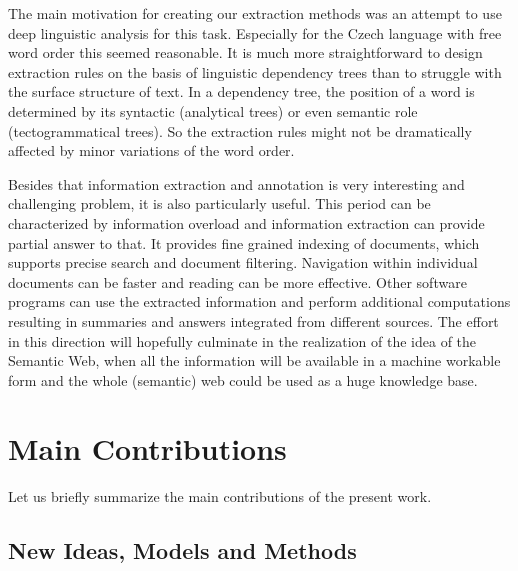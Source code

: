 
The main motivation for creating our extraction methods was an attempt to use deep linguistic analysis for this task. Especially for the Czech language with free word order this seemed reasonable. It is much more straightforward to design extraction rules on the basis of linguistic dependency trees than to struggle with the surface structure of text. In a dependency tree, the position of a word is determined by its syntactic (analytical trees) or even semantic role (tectogrammatical trees). So the extraction rules might not be dramatically affected by minor variations of the word order.

Besides that information extraction and annotation is very interesting and challenging problem, it is also particularly useful. This period can be characterized by information overload and information extraction can provide partial answer to that. It provides fine grained indexing of documents, which supports precise search and document filtering. Navigation within individual documents can be faster and reading can be more effective. Other software programs can use the extracted information and perform additional computations resulting in summaries and answers integrated from different sources.  The effort in this direction will hopefully culminate in the realization of the idea of the Semantic Web, when all the information will be available in a machine workable form and the whole (semantic) web could be used as a huge knowledge base.



\section{Main Contributions} \label{sec:phd_contributions}

Let us briefly summarize the main contributions of the present work.

\subsection{New Ideas, Models and Methods}

